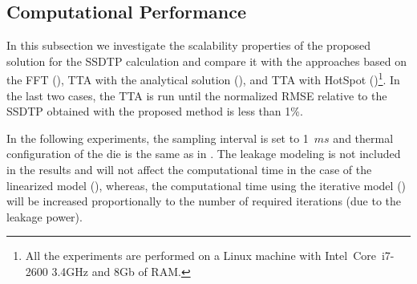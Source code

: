\subsection{Computational Performance} \label{sec:results-ssdtp}
In this subsection we investigate the scalability properties of the proposed solution for the SSDTP calculation and compare it with the approaches based on the FFT (), TTA with the analytical solution (), and TTA with HotSpot ()\footnote{All the experiments are performed on a Linux machine with Intel\textregistered\ Core\texttrademark\ i7-2600 3.4GHz and 8Gb of RAM.}. In the last two cases, the TTA is run until the normalized RMSE relative to the SSDTP obtained with the proposed method is less than 1\%.

In the following experiments, the sampling interval is set to \mbox{1 $ms$} and thermal configuration of the die is the same as in . The leakage modeling is not included in the results and will not affect the computational time in the case of the linearized model (), whereas, the computational time using the iterative model () will be increased proportionally to the number of required iterations (due to the leakage power).

